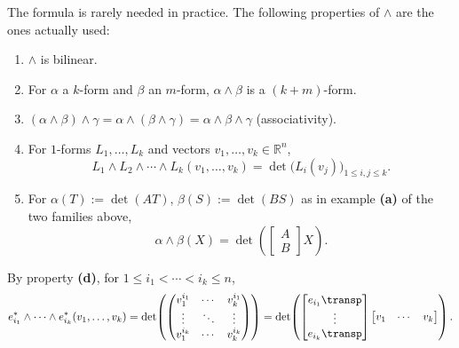The formula is rarely needed in practice. The following properties of $\wedge$ are the ones actually used:
\begin{enumerate}[label=\textbf{(\alph*)}]
  \item $\wedge$ is bilinear.
  \item For $\alpha$ a $k$-form and $\beta$ an $m$-form, $\alpha\wedge\beta$ is a $(k+m)$-form.
  \item $(\alpha\wedge\beta)\wedge\gamma = \alpha\wedge(\beta\wedge\gamma) = \alpha\wedge\beta
  \wedge\gamma$ (associativity).
  \item For $1$-forms $L_1,\ldots,L_k$ and vectors $v_1,\ldots,v_k \in \mathbb{R}^n$,
  \[L_1\wedge L_2\wedge\cdots\wedge L_k(v_1,\ldots,v_k) = \det\big(L_i(v_j)\big)_{1\leq i,j
  \leq k}.\]
  \item For $\alpha(T) := \det(AT)$, $\beta(S) := \det(BS)$ as in example \textbf{(a)} of the two
  families above,
  \[\alpha\wedge\beta(X) = \det\!\left(\begin{bmatrix} A \\ B \end{bmatrix} X\right).\]
\end{enumerate}

\begin{example}
By property \textbf{(d)}, for $1 \leq i_1 < \cdots < i_k \leq n$,
\[
e_{i_1}^*\wedge\cdots\wedge e_{i_k}^*(v_1,\ldots,v_k) = \det\!\left(
  \begin{pmatrix} v_1^{i_1} & \cdots & v_k^{i_1} \\ \vdots & \ddots & \vdots \\ v_1^{i_k} &
  \cdots & v_k^{i_k} \end{pmatrix}\right)
  = \det\!\left(\begin{bmatrix} e_{i_1}\transp \\ \vdots \\ e_{i_k}\transp \end{bmatrix}
  \begin{bmatrix} v_1 & \cdots & v_k \end{bmatrix}\right).
\]
\end{example}

